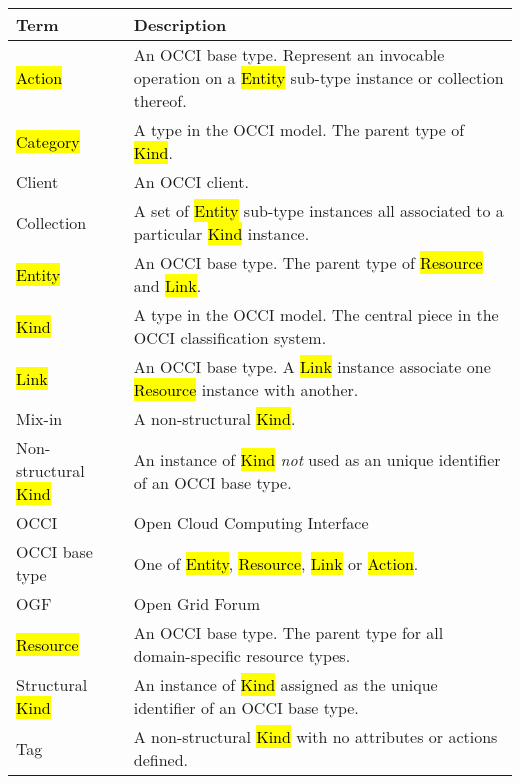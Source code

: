 \begin{tabular}{l|p{11cm}}
Term & Description \\
\hline
\hl{Action} & An OCCI base type. Represent an invocable operation on a \hl{Entity} sub-type instance or collection thereof. \\
\hl{Category} & A type in the OCCI model. The parent type of \hl{Kind}. \\
Client & An OCCI client.\\
Collection & A set of \hl{Entity} sub-type instances all associated to a particular \hl{Kind} instance. \\
\hl{Entity} & An OCCI base type. The parent type of \hl{Resource} and \hl{Link}. \\
\hl{Kind} & A type in the OCCI model. The central piece in the OCCI classification system. \\
\hl{Link} & An OCCI base type. A \hl{Link} instance associate one \hl{Resource} instance with another. \\
Mix-in & A non-structural \hl{Kind}. \\
Non-structural \hl{Kind} & An instance of \hl{Kind} {\em not} used as an unique identifier of an OCCI base type. \\
OCCI & Open Cloud Computing Interface \\
OCCI base type & One of \hl{Entity}, \hl{Resource}, \hl{Link} or \hl{Action}. \\
OGF & Open Grid Forum \\
\hl{Resource} & An OCCI base type. The parent type for all domain-specific resource types. \\
Structural \hl{Kind} & An instance of \hl{Kind} assigned as the unique identifier of an OCCI base type. \\
Tag & A non-structural \hl{Kind} with no attributes or actions defined. \\
\end{tabular}
